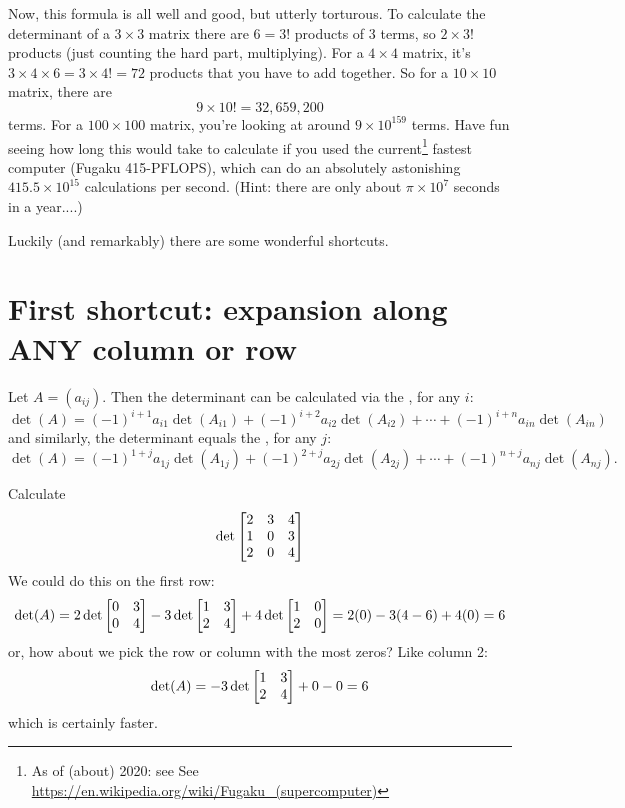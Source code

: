 Now, this formula is all well and good, but utterly torturous.  
To calculate the determinant of a $3\times 3$ matrix there are $6=3!$ products of 3 terms, so $2\times 3!$ products
(just counting the hard part, multiplying).  For a $4\times 4$
matrix, it's $3 \times 4\times 6   = 3\times 4!=72$ products that you have to add together.
So for a $10\times 10$ matrix, there are
$$
9\times 10! = 32,659,200  
$$
terms.  For a $100 \times 100$ matrix, you're looking at around $9\times 10^{159}$
terms.  Have fun seeing how long this would take to calculate if
you used the current\footnote{As of (about) 2020: see See {\color{blue}\url{https://en.wikipedia.org/wiki/Fugaku_(supercomputer)}}} fastest computer (Fugaku 415-PFLOPS), which can
do an absolutely astonishing $415.5\times 10^{15}$ calculations per second.
(Hint: there are only about $\pi \times 10^{7}$ seconds in a year....)

Luckily (and remarkably) there are some wonderful shortcuts.

\section{First shortcut: expansion along ANY column or row}

\begin{theorem}
Let $A = (a_{ij})$.  Then the determinant can be  calculated via the , for any $i$:
$$
\det(A) = (-1)^{i+1}a_{i1}\det(A_{i1}) + (-1)^{i+2}a_{i2}\det(A_{i2}) + \cdots + (-1)^{i+n}a_{in}\det(A_{in})
$$
and similarly, the determinant equals the , for any $j$:
$$
\det(A) = (-1)^{1+j}a_{1j}\det(A_{1j}) + (-1)^{2+j}a_{2j}\det(A_{2j}) + \cdots + (-1)^{n+j}a_{nj}\det(A_{nj}).
$$
\end{theorem}



\begin{myexample} Calculate
$$\det\left[ \begin{matrix} 2 & 3 & 4\\ 1 & 0 & 3\\ 2 &0 & 4 \end{matrix} \right]$$
We could do this on the first row:
$$
\det(A)=2\det\left[ \begin{matrix} 0&3\\0&4 \end{matrix} \right] - 3\det\left[ \begin{matrix} 1&3\\2&4 \end{matrix} \right]+4\det\left[ \begin{matrix} 1&0\\2&0 \end{matrix} \right]
= 2(0) - 3(4-6) +4(0) = 6
$$
or, how about we pick the row or column with the most zeros?  Like
column 2:
$$
\det(A) = -3\det\left[ \begin{matrix} 1&3\\2&4 \end{matrix} \right] + 0 - 0 = 6
$$
which is certainly faster.
\end{myexample}

